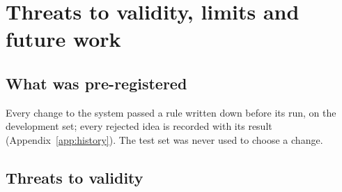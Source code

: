 \section{Threats to validity, limits and future work}\label{sec:limits}\label{sec:disclosures}

\subsection{What was pre-registered}
Every change to the system passed a rule written down before its run, on the development set; every rejected idea is
recorded with its result (Appendix~\ref{app:history}). The test set was never used to choose a change.

\subsection{Threats to validity}
